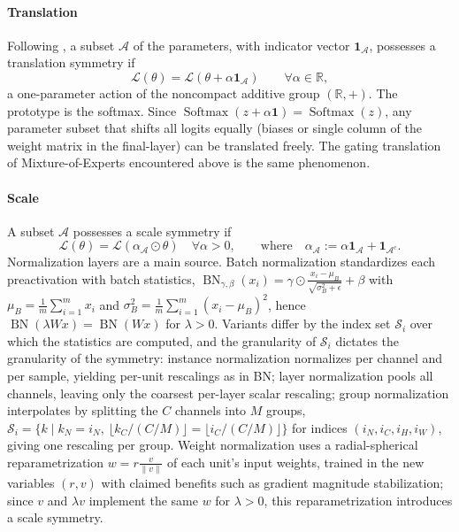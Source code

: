\documentclass[mathematics,review,submit,moreauthors]{Definitions/mdpi}
\begin{document}
\paragraph{Translation}
Following \citet{kunin2020}, a subset $\mathcal{A}$ of the parameters, with indicator vector $\boldsymbol{1}_{\mathcal{A}}$, possesses a translation symmetry if
\begin{equation*}
    \mathcal{L}(\theta)=\mathcal{L}(\theta+\alpha\boldsymbol{1}_{\mathcal{A}}) \qquad \forall\alpha\in\mathbb{R},
\end{equation*}
a one-parameter action of the noncompact additive group $(\mathbb{R},+)$.
The prototype is the softmax.
Since $\operatorname{Softmax}(z+\alpha\boldsymbol{1})=\operatorname{Softmax}(z)$, any parameter subset that shifts all logits equally (biases or single column of the weight matrix in the final-layer) can be translated freely.
The gating translation of Mixture-of-Experts encountered above is the same phenomenon.

\paragraph{Scale}
A subset $\mathcal{A}$ possesses a scale symmetry if \citep{kunin2020}
\begin{equation*}
    \mathcal{L}(\theta)=\mathcal{L}(\alpha_{\mathcal{A}}\odot\theta) \quad \forall\alpha>0, \qquad \text{where}\quad \alpha_{\mathcal{A}}:=\alpha\boldsymbol{1}_{\mathcal{A}}+\boldsymbol{1}_{\mathcal{A}^{c}}.
\end{equation*}
Normalization layers are a main source.
Batch normalization \citep{ioffe2015p3icml} standardizes each preactivation with batch statistics, $\operatorname{BN}_{\gamma,\beta}(x_i)=\gamma\odot\frac{x_i-\mu_B}{\sqrt{\sigma_B^2+\epsilon}}+\beta$ with $\mu_B=\frac{1}{m}\sum_{i=1}^{m}x_i$ and $\sigma_B^2=\frac{1}{m}\sum_{i=1}^{m}(x_i-\mu_B)^2$, hence $\operatorname{BN}(\lambda Wx)=\operatorname{BN}(Wx)$ for $\lambda>0$.
Variants differ by the index set $\mathcal{S}_i$ over which the statistics are computed, and the granularity of $\mathcal{S}_i$ dictates the granularity of the symmetry: instance normalization \citep{ulyanov2017} normalizes per channel and per sample, yielding per-unit rescalings as in BN; layer normalization \citep{ba2016} pools all channels, leaving only the coarsest per-layer scalar rescaling; group normalization \citep{wu2018a} interpolates by splitting the $C$ channels into $M$ groups, $\mathcal{S}_i=\big\{k \mid k_N=i_N,\ \lfloor k_C/(C/M)\rfloor=\lfloor i_C/(C/M)\rfloor\big\}$ for indices $(i_N,i_C,i_H,i_W)$, giving one rescaling per group.
Weight normalization \citep{salimans2016anips} uses a radial-spherical reparametrization $w=r\frac{v}{\lVert v\rVert}$ of each unit's input weights, trained in the new variables $(r,v)$ with claimed benefits such as gradient magnitude stabilization; since $v$ and $\lambda v$ implement the same $w$ for $\lambda>0$, this reparametrization introduces a scale symmetry.
\end{document}

